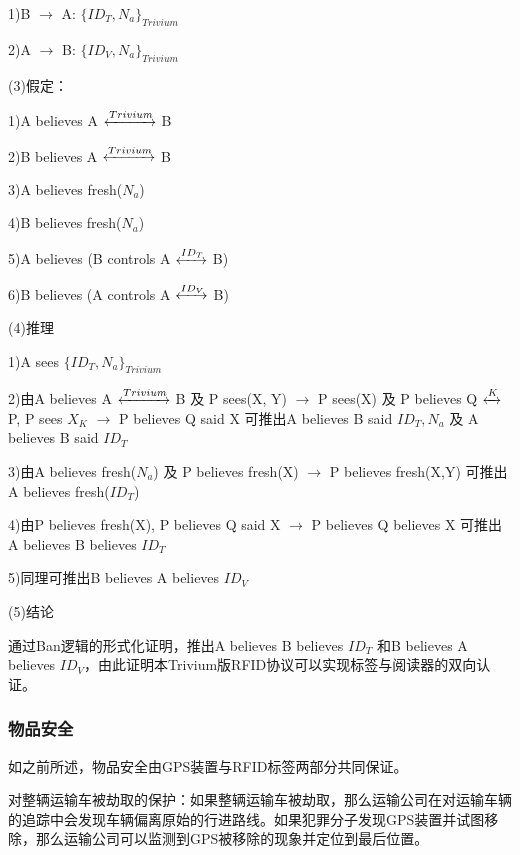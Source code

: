 1)B $\rightarrow$ A: $\{ID_{T}, N_{a}\}_{Trivium}$

2)A $\rightarrow$ B: $\{ID_{V}, N_{a}\}_{Trivium}$

\vspace{3ex}

(3)假定：

1)A believes A $\xleftrightarrow{Trivium}$ B 

2)B believes A $\xleftrightarrow{Trivium}$ B 

3)A believes fresh($N_{a}$) 

4)B believes fresh($N_{a}$) 

5)A believes (B controls A $\xleftrightarrow{ID_{T}}$ B) 

6)B believes (A controls A $\xleftrightarrow{ID_{V}}$ B) 

\vspace{3ex}

(4)推理

1)A sees $\{ID_{T}, N_{a}\}_{Trivium}$ 

2)由A believes A $\xleftrightarrow{Trivium}$ B 及 P sees(X, Y) $\rightarrow$ P sees(X) 及 P believes Q $\xleftrightarrow{K}$ P, P sees ${X}_{K}$ $\rightarrow$ P believes Q said X 可推出A believes B said {$ID_{T}, N_{a}$} 及 A believes B said $ID_{T}$

3)由A believes fresh($N_{a}$) 及 P believes fresh(X) $\rightarrow$ P believes fresh(X,Y) 可推出A believes fresh($ID_{T}$)

4)由P believes fresh(X), P believes Q said X $\rightarrow$ P believes Q believes X 可推出A believes B believes $ID_{T}$ 

5)同理可推出B believes A believes $ID_{V}$

\vspace{3ex}

(5)结论

通过Ban逻辑的形式化证明，推出A believes B believes $ID_{T}$ 和B believes A believes $ID_{V}$，由此证明本Trivium版RFID协议可以实现标签与阅读器的双向认证。



\subsubsection{物品安全}

如之前所述，物品安全由GPS装置与RFID标签两部分共同保证。

对整辆运输车被劫取的保护：如果整辆运输车被劫取，那么运输公司在对运输车辆的追踪中会发现车辆偏离原始的行进路线。如果犯罪分子发现GPS装置并试图移除，那么运输公司可以监测到GPS被移除的现象并定位到最后位置。

